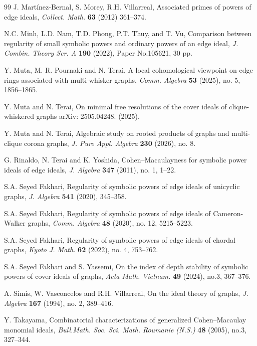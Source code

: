 \documentclass[12pt]{amsart}
\theoremstyle{definition}
\theoremstyle{remark}
\begin{document}
\begin{thebibliography}{99}
 J. Martínez-Bernal, S. Morey, R.H. Villarreal, 
Associated primes of powers of edge ideals, 
{\it Collect. Math.} {\bf 63} (2012) 361--374. 

N.C. Minh, L.D. Nam, T.D. Phong, P.T. Thuy, and T. Vu, 
Comparison between regularity of small symbolic powers and ordinary powers of an edge ideal, 
{\it J. Combin. Theory Ser. A} {\bf 190} (2022), Paper No.105621, 30 pp.

 Y. Muta, M. R. Pournaki and N. Terai, 
A local cohomological viewpoint on edge rings associated with multi-whisker graphs, 
\textit{Comm. Algebra} {\bf 53} (2025), no. 5, 1856--1865.

 Y. Muta and N. Terai, 
On minimal free resolutions of the cover ideals of clique-whiskered graphs
arXiv: 2505.04248. (2025).

 Y. Muta and N. Terai, 
Algebraic study on rooted products of graphs and multi-clique corona graphs, 
{\it J. Pure Appl. Algebra} {\bf 230} (2026), no. 8. 

 G. Rinaldo, N. Terai and K. Yoshida, 
Cohen--Macaulayness for symbolic power ideals of edge ideals, 
{\it J. Algebra} {\bf 347} (2011), no. 1, 1--22. 

 S.A. Seyed Fakhari, 
Regularity of symbolic powers of edge ideals of unicyclic graphs, 
{\it J. Algebra} {\bf 541} (2020), 345--358.

 S.A. Seyed Fakhari,
Regularity of symbolic powers of edge ideals of Cameron-Walker graphs, 
{\it Comm. Algebra} {\bf 48} (2020), no. 12, 5215--5223.

 S.A. Seyed Fakhari,
Regularity of symbolic powers of edge ideals of chordal graphs, 
{\it Kyoto J. Math.} {\bf 62} (2022), no. 4, 753--762.

 S.A. Seyed Fakhari and S. Yassemi,
On the index of depth stability of symbolic powers of cover ideals of graphs,
{\it Acta Math. Vietnam.} {\bf 49} (2024), no.3, 367--376. 

 A. Simis, W. Vasconcelos and R.H. Villarreal, 
On the ideal theory of graphs, 
{\it J. Algebra} {\bf 167} (1994), no. 2, 389--416.

 Y. Takayama, 
Combinatorial characterizations of generalized Cohen--Macaulay monomial ideals, 
{\it Bull.Math. Soc. Sci. Math. Roumanie (N.S.)} {\bf 48} (2005), no.3, 327--344. 


\end{thebibliography}
\end{document}
